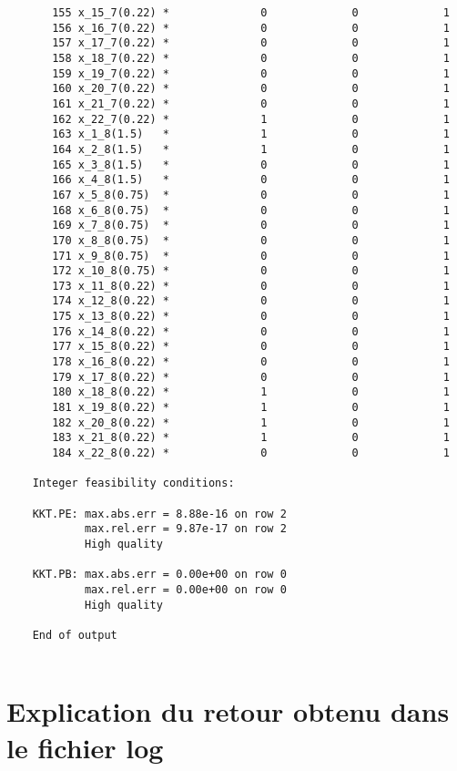 \documentclass{article}[A4]
\begin{document}
\begin{verbatim}
	   155 x_15_7(0.22) *              0             0             1 
	   156 x_16_7(0.22) *              0             0             1 
	   157 x_17_7(0.22) *              0             0             1 
	   158 x_18_7(0.22) *              0             0             1 
	   159 x_19_7(0.22) *              0             0             1 
	   160 x_20_7(0.22) *              0             0             1 
	   161 x_21_7(0.22) *              0             0             1 
	   162 x_22_7(0.22) *              1             0             1 
	   163 x_1_8(1.5)   *              1             0             1 
	   164 x_2_8(1.5)   *              1             0             1 
	   165 x_3_8(1.5)   *              0             0             1 
	   166 x_4_8(1.5)   *              0             0             1 
	   167 x_5_8(0.75)  *              0             0             1 
	   168 x_6_8(0.75)  *              0             0             1 
	   169 x_7_8(0.75)  *              0             0             1 
	   170 x_8_8(0.75)  *              0             0             1 
	   171 x_9_8(0.75)  *              0             0             1 
	   172 x_10_8(0.75) *              0             0             1 
	   173 x_11_8(0.22) *              0             0             1 
	   174 x_12_8(0.22) *              0             0             1 
	   175 x_13_8(0.22) *              0             0             1 
	   176 x_14_8(0.22) *              0             0             1 
	   177 x_15_8(0.22) *              0             0             1 
	   178 x_16_8(0.22) *              0             0             1 
	   179 x_17_8(0.22) *              0             0             1 
	   180 x_18_8(0.22) *              1             0             1 
	   181 x_19_8(0.22) *              1             0             1 
	   182 x_20_8(0.22) *              1             0             1 
	   183 x_21_8(0.22) *              1             0             1 
	   184 x_22_8(0.22) *              0             0             1 
	
	Integer feasibility conditions:
	
	KKT.PE: max.abs.err = 8.88e-16 on row 2
	        max.rel.err = 9.87e-17 on row 2
	        High quality
	
	KKT.PB: max.abs.err = 0.00e+00 on row 0
	        max.rel.err = 0.00e+00 on row 0
	        High quality
	
	End of output
	
\end{verbatim}
\section{Explication du retour obtenu dans le fichier log}
\end{document}
